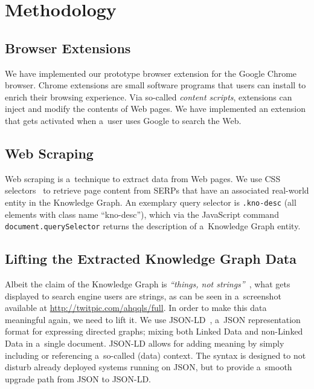 \documentclass[runningheads,a4paper]{llncs}
\begin{document}
\section{Methodology} \label{sec:methodology}
\subsection{Browser Extensions}
We have implemented our prototype browser extension for the Google Chrome browser.
Chrome extensions are small software programs that users can install
to enrich their browsing experience.
Via so-called \emph{content scripts},
extensions can inject and modify the contents of Web pages.
We have implemented an extension that gets activated when a~user
uses Google to search the Web.

\subsection{Web Scraping}
Web scraping is a~technique to extract data from Web pages.
We use CSS selectors~\cite{hunt2012} to retrieve page content from SERPs
that have an associated real-world entity in the Knowledge Graph.
An exemplary query selector is \texttt{.kno-desc}
(all elements with class name ``kno-desc''),
which via the JavaScript command \texttt{document.querySelector}
returns the description of a~Knowledge Graph entity.

\subsection{Lifting the Extracted Knowledge Graph Data} \label{sec:lifting}
Albeit the claim of the Knowledge Graph is
\textit{``things, not strings''}~\cite{singhal2012_1},
what gets displayed to search engine users are strings,
as can be seen in a~screenshot available at \url{http://twitpic.com/ahqqls/full}.
In order to make this data meaningful again, we need to lift it.
We use JSON-LD~\cite{sporny2012}, a~JSON representation format
for expressing directed graphs;
mixing both Linked Data and non-Linked Data in a~single document.
JSON-LD allows for adding meaning
by simply including or referencing a~so-called (data) context.
The syntax is designed to not disturb already deployed systems running on JSON,
but to provide a~smooth upgrade path from JSON to JSON-LD.
\end{document}
